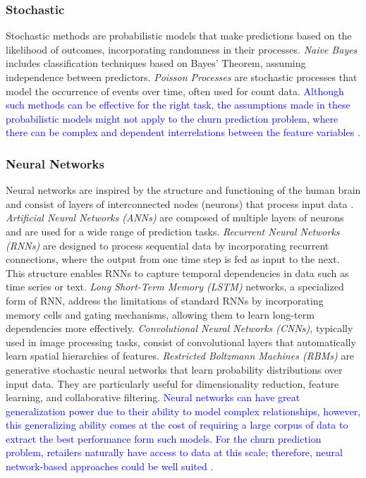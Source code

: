 \documentclass[preprint,12pt]{elsarticle}
\begin{document}
\subsubsection{Stochastic} 
Stochastic methods are probabilistic models that make predictions based on the likelihood of outcomes, incorporating randomness in their processes. \textit{Naive Bayes} \cite{gladence2015statistical} includes classification techniques based on Bayes' Theorem, assuming independence between predictors. \textit{Poisson Processes} \cite{kingman1992poisson} are stochastic processes that model the occurrence of events over time, often used for count data. \textcolor{blue}{Although such methods can be effective for the right task, the assumptions made in these probabilistic models might not apply to the churn prediction problem, where there can be complex and dependent interrelations between the feature variables \cite{sahami1996learning}.} 

\subsubsection{Neural Networks}

Neural networks are inspired by the structure and functioning of the human brain and consist of layers of interconnected nodes (neurons) that process input data \cite{janiesch2021machine}. \textit{Artificial Neural Networks (ANNs)} are composed of multiple layers of neurons and are used for a wide range of prediction tasks. \textit{Recurrent Neural Networks (RNNs)} are designed to process sequential data by incorporating recurrent connections, where the output from one time step is fed as input to the next. This structure enables RNNs to capture temporal dependencies in data such as time series or text. \textit{Long Short-Term Memory (LSTM)} networks, a specialized form of RNN, address the limitations of standard RNNs by incorporating memory cells and gating mechanisms, allowing them to learn long-term dependencies more effectively. \textit{Convolutional Neural Networks (CNNs)}, typically used in image processing tasks, consist of convolutional layers that automatically learn spatial hierarchies of features. \textit{Restricted Boltzmann Machines (RBMs)} are generative stochastic neural networks that learn probability distributions over input data. They are particularly useful for dimensionality reduction, feature learning, and collaborative filtering. \textcolor{blue}{Neural networks can have great generalization power due to their ability to model complex relationships, however, this generalizing ability comes at the cost of requiring a large corpus of data to extract the best performance form such models. For the churn prediction problem, retailers naturally have access to data at this scale; therefore, neural network-based approaches could be well suited \cite{ajiboye2015evaluating}. }
\end{document}

